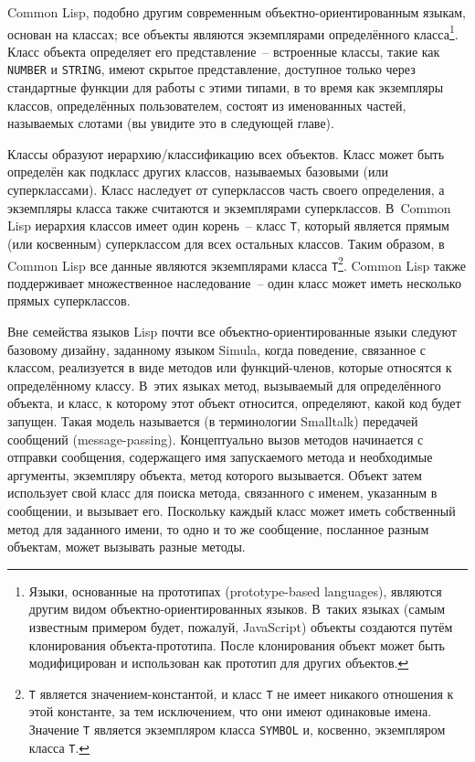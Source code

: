 Common Lisp, подобно другим современным объектно-ориентированным языкам, основан на
классах; все объекты являются экземплярами определённого класса\footnote{Языки, основанные
  на прототипах (prototype-based languages), являются другим видом объектно-ориентированных
  языков. В~таких языках (самым известным примером будет, пожалуй, JavaScript) объекты
  создаются путём клонирования объекта-прототипа. После клонирования объект может быть
  модифицирован и использован как прототип для других объектов.}.  Класс объекта
определяет его представление~-- встроенные классы, такие как \lstinline{NUMBER} и \lstinline{STRING},
имеют скрытое представление, доступное только через стандартные функции для работы с этими
типами, в то время как экземпляры классов, определённых пользователем, состоят из
именованных частей, называемых слотами (вы увидите это в следующей главе).

Классы образуют иерархию/классификацию всех объектов.  Класс может быть определён как
подкласс других классов, называемых базовыми (или суперклассами).  Класс наследует от
суперклассов часть своего определения, а экземпляры класса также считаются и экземплярами
суперклассов.  В~Common Lisp иерархия классов имеет один корень~-- класс \lstinline{T}, который
является прямым (или косвенным) суперклассом для всех остальных классов.  Таким образом, в
Common Lisp все данные являются экземплярами класса \lstinline{T}\footnote{\lstinline{T} является
  значением-константой, и класс \lstinline{T} не имеет никакого отношения к этой константе, за
  тем исключением, что они имеют одинаковые имена.  Значение \lstinline{T} является экземпляром
  класса \lstinline{SYMBOL} и, косвенно, экземпляром класса \lstinline{T}.}.  Common Lisp также
поддерживает множественное наследование~-- один класс может иметь несколько прямых
суперклассов.

Вне семейства языков Lisp почти все объектно-ориентированные языки следуют базовому
дизайну, заданному языком Simula, когда поведение, связанное с классом, реализуется в виде
методов или функций-членов, которые относятся к определённому классу.  В~этих языках
метод, вызываемый для определённого объекта, и класс, к которому этот объект относится,
определяют, какой код будет запущен.  Такая модель называется (в терминологии Smalltalk)
передачей сообщений (message-passing).  Концептуально вызов методов начинается с отправки
сообщения, содержащего имя запускаемого метода и необходимые аргументы, экземпляру
объекта, метод которого вызывается.  Объект затем использует свой класс для поиска метода,
связанного с именем, указанным в сообщении, и вызывает его.  Поскольку каждый класс может
иметь собственный метод для заданного имени, то одно и то же сообщение, посланное разным
объектам, может вызывать разные методы.

